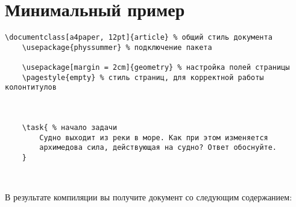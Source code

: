 \section{Минимальный пример}


\begin{lstlisting}[keepspaces, gobble = 3]
    \documentclass[a4paper, 12pt]{article} % общий стиль документа
    \usepackage{physsummer} % подключение пакета

    \usepackage[margin = 2cm]{geometry} % настройка полей страницы
    \pagestyle{empty} % стиль страниц, для корректной работы колонтитулов

    

    \task{ % начало задачи
        Судно выходит из реки в море. Как при этом изменяется
        архимедова сила, действующая на судно? Ответ обоснуйте.
    }

    
\end{lstlisting}

В результате компиляции вы получите документ со следующим содержанием:

\noindent
{}

\vspace{0.5cm}